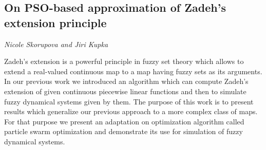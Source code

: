 \documentclass[../booklet.tex]{subfiles}
\begin{document}
\subsection[On PSO-based approximation of Zadeh’s extension principle. {\it Nicole Skorupova and Jiri Kupka}]{On PSO-based approximation of Zadeh’s extension principle}
 

\begin{center}
  {\it Nicole Skorupova and Jiri Kupka}
\end{center}



Zadeh's extension is a powerful principle in fuzzy set theory which allows to extend a real-valued continuous map to a map having fuzzy sets as its arguments. In our previous work we introduced an algorithm which can compute Zadeh’s extension of given continuous piecewise linear functions and then to simulate fuzzy dynamical systems given by them. The purpose of this work is to present results which generalize our previous approach to a more complex class of maps. For that purpose we present an adaptation on optimization algorithm called particle swarm optimization and demonstrate its use for simulation of fuzzy dynamical systems.

\end{document}

